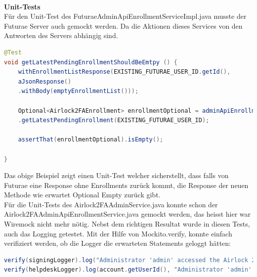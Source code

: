 \\
\textbf{Unit-Tests}\\
Für den Unit-Test des FuturaeAdminApiEnrollmentServiceImpl.java musste der Futurae Server auch gemockt werden. Da die Aktionen dieses Services von den Antworten des Servers abhängig sind.
\begin{lstlisting}[language=Java]
@Test
void getLatestPendingEnrollmentShouldBeEmtpy () {
	withEnrollmentListResponse(EXISTING_FUTURAE_USER_ID.getId(),
	aJsonResponse()
	.withBody(emptyEnrollmentList()));
	
	Optional<Airlock2FAEnrollment> enrollmentOptional = adminApiEnrollmentService()
	.getLatestPendingEnrollment(EXISTING_FUTURAE_USER_ID);
	
	assertThat(enrollmentOptional).isEmpty();
	
}
\end{lstlisting}
Das obige Beispiel zeigt einen Unit-Test welcher sicherstellt, dass falls von Futurae eine Response ohne Enrollments zurück kommt, die Response der neuen Methode wie erwartet Optional Empty zurück gibt.\\
Für die Unit-Tests des Airlock2FAAdminService.java konnte schon der\\
Airlock2FAAdminApiEnrollmentService.java gemockt werden, das heisst hier war Wiremock nicht mehr nötig. Nebst dem richtigen Resultat wurde in diesen Tests, auch das Logging getestet. Mit der Hilfe von Mockito.verify, konnte einfach verifiziert werden, ob die Logger die erwarteten Statements geloggt hätten:
\begin{lstlisting}[language=Java]
verify(signingLogger).log("Administrator 'admin' accessed the Airlock 2FA short activation code of user 'user'.");
verify(helpdeskLogger).log(account.getUserId(), "Administrator 'admin' accessed the Airlock 2FA short activation code.");
\end{lstlisting}
